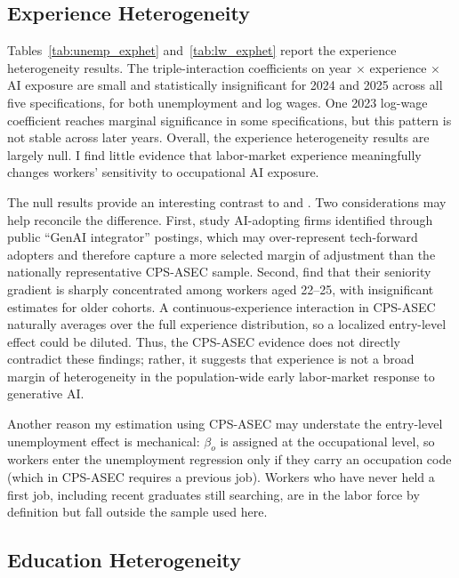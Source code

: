 \documentclass[11pt]{article}
\theoremstyle{plain}
\theoremstyle{remark}
\begin{document}
\subsection{Experience Heterogeneity}

Tables~\ref{tab:unemp_exphet} and~\ref{tab:lw_exphet} report the experience heterogeneity results. The triple-interaction coefficients on year $\times$ experience $\times$ AI exposure are small and statistically insignificant for 2024 and 2025 across all five specifications, for both unemployment and log wages. One 2023 log-wage coefficient reaches marginal significance in some specifications, but this pattern is not stable across later years. Overall, the experience heterogeneity results are largely null. I find little evidence that labor-market experience meaningfully changes workers’ sensitivity to occupational AI exposure.

The null results provide an interesting contrast to \textcite{hosseini2025seniority} and \textcite{brynjolfsson2025canaries}. Two considerations may help reconcile the difference. First, \textcite{hosseini2025seniority} study AI-adopting firms identified through public ``GenAI integrator'' postings, which may over-represent tech-forward adopters and therefore capture a more selected margin of adjustment than the nationally representative CPS-ASEC sample. Second, \textcite{brynjolfsson2025canaries} find that their seniority gradient is sharply concentrated among workers aged 22--25, with insignificant estimates for older cohorts. A continuous-experience interaction in CPS-ASEC naturally averages over the full experience distribution, so a localized entry-level effect could be diluted. Thus, the CPS-ASEC evidence does not directly contradict these findings; rather, it suggests that experience is not a broad margin of heterogeneity in the population-wide early labor-market response to generative AI.

Another reason my estimation using CPS-ASEC may understate the entry-level unemployment effect is mechanical: $\beta_o$ is assigned at the occupational level, so workers enter the unemployment regression only if they carry an occupation code (which in CPS-ASEC requires a previous job).  Workers who have never held a first job, including recent graduates still searching, are in the labor force by definition but fall outside the sample used here. 


\subsection{Education Heterogeneity}
\end{document}
